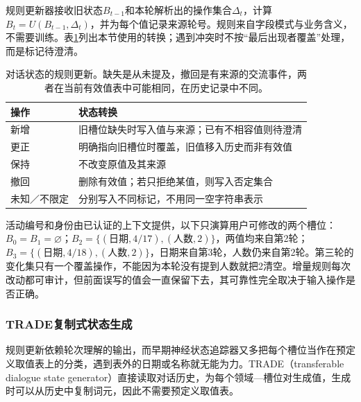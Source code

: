 规则更新器接收旧状态$B_{t-1}$和本轮解析出的操作集合$\Delta_t$，计算$B_t=U(B_{t-1},\Delta_t)$，并为每个值记录来源轮号。规则来自字段模式与业务含义，不需要训练。表\ref{tab:nlp-dialogue-state-update}列出本节使用的转换；遇到冲突时不按“最后出现者覆盖”处理，而是标记待澄清。

\begin{table}[htbp]
\centering
\begin{tabular}{p{22mm}p{74mm}}
\toprule
操作 & 状态转换\\
\midrule
新增 & 旧槽位缺失时写入值与来源；已有不相容值则待澄清\\
更正 & 明确指向旧槽位时覆盖，旧值移入历史而非有效值\\
保持 & 不改变原值及其来源\\
撤回 & 删除有效值；若只拒绝某值，则写入否定集合\\
未知／不限定 & 分别写入不同标记，不用同一空字符串表示\\
\bottomrule
\end{tabular}
\caption{对话状态的规则更新。缺失是从未提及，撤回是有来源的交流事件，两者在当前有效值表中可能相同，在历史记录中不同。}
\label{tab:nlp-dialogue-state-update}
\end{table}

活动编号和身份由已认证的上下文提供，以下只演算用户可修改的两个槽位：$B_0=B_1=\varnothing$；$B_2=\{(\text{日期},4/17),(\text{人数},2)\}$，两值均来自第2轮；$B_3=\{(\text{日期},4/18),(\text{人数},2)\}$，日期来自第3轮，人数仍来自第2轮。第三轮的变化集只有一个覆盖操作，不能因为本轮没有提到人数就把2清空。增量规则每次改动都可审计，但前面误写的值会一直保留下去，其可靠性完全取决于输入操作是否正确。

\subsubsection{TRADE复制式状态生成}
\label{sec:nlp-dialogue-trade}

规则更新依赖轮次理解的输出，而早期神经状态追踪器又多把每个槽位当作在预定义取值表上的分类，遇到表外的日期或名称就无能为力。TRADE（transferable dialogue state generator）直接读取对话历史，为每个领域—槽位对生成值，生成时可以从历史中复制词元，因此不需要预定义取值表。

